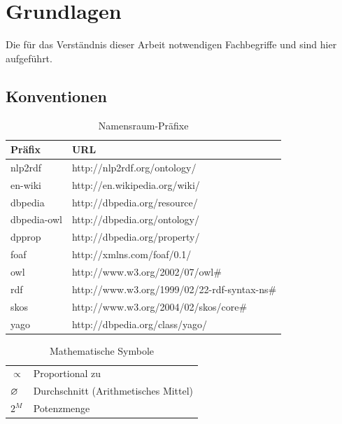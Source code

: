 \chapter{Grundlagen}\label{sec:grundlagen}
Die für das Verständnis dieser Arbeit notwendigen Fachbegriffe und sind hier aufgeführt.
\section{Konventionen}
\begin{table}[ht]
\begin{tabular}{ll}
\toprule
Präfix	&URL\\
\midrule
nlp2rdf		&http://nlp2rdf.org/ontology/\\
en-wiki		&http://en.wikipedia.org/wiki/\\
dbpedia		&http://dbpedia.org/resource/\\
dbpedia-owl	&http://dbpedia.org/ontology/\\
dpprop		&http://dbpedia.org/property/\\
foaf		&http://xmlns.com/foaf/0.1/\\
owl		&http://www.w3.org/2002/07/owl\#\\
rdf		&http://www.w3.org/1999/02/22-rdf-syntax-ns\#\\
skos		&http://www.w3.org/2004/02/skos/core\#\\
yago		&http://dbpedia.org/class/yago/\\
\bottomrule
\end{tabular}
\caption{Namensraum-Präfixe}
\label{tab:namespace-prefixes}
\end{table}

\begin{table}[ht]
\begin{tabular}{ll}
\toprule
$\propto$	&Proportional zu\\
$\varnothing$	&Durchschnitt (Arithmetisches Mittel)\\
$2^M$		&Potenzmenge\\
\bottomrule
\end{tabular}
\caption{Mathematische Symbole}
\label{tab:}
\end{table}

